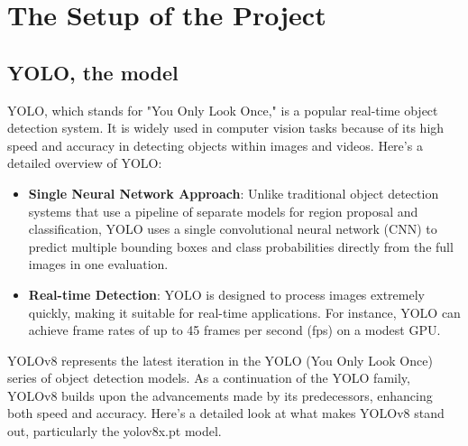 \documentclass[../main]{subfiles}
\begin{document}
\chapter{The Setup of the Project}

{
\hypersetup{linkcolor=black}
\minitoc
}

\section{YOLO, the model}
YOLO, which stands for "You Only Look Once," is a popular real-time object detection system. It is widely used in computer vision tasks because of its high speed and accuracy in detecting objects within images and videos. Here's a detailed overview of YOLO:

\begin{itemize}
    \item[\textbullet] \textbf{Single Neural Network Approach}: Unlike traditional object detection systems that use a pipeline of separate models for region proposal and classification, YOLO uses a single convolutional neural network (CNN) to predict multiple bounding boxes and class probabilities directly from the full images in one evaluation.
    \item[\textbullet] \textbf{Real-time Detection}: YOLO is designed to process images extremely quickly, making it suitable for real-time applications. For instance, YOLO can achieve frame rates of up to 45 frames per second (fps) on a modest GPU.
    
\end{itemize}
YOLOv8 represents the latest iteration in the YOLO (You Only Look Once) series of object detection models. As a continuation of the YOLO family, YOLOv8 builds upon the advancements made by its predecessors, enhancing both speed and accuracy. Here’s a detailed look at what makes YOLOv8 stand out, particularly the yolov8x.pt model.
\end{document}
